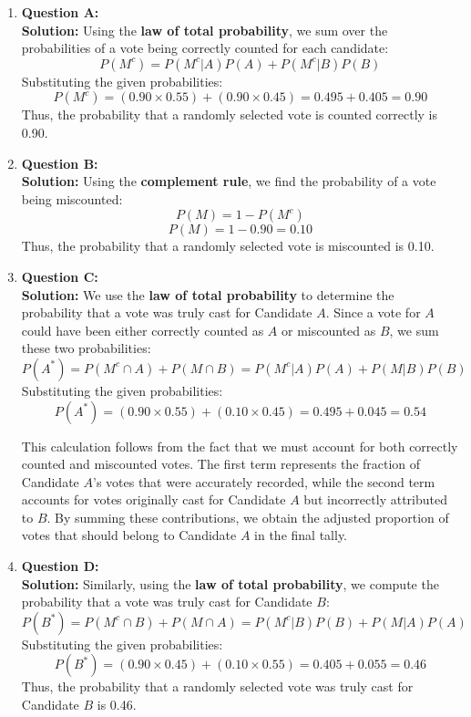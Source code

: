 \documentclass{article}
\begin{document}
\begin{enumerate}

    \item \textbf{Question A:} \\
    \textbf{Solution:} Using the \textbf{law of total probability}, we sum over the probabilities of a vote being correctly counted for each candidate:
    \[
    P(M^c) = P(M^c | A) P(A) + P(M^c | B) P(B)
    \]
    Substituting the given probabilities:
    \[
    P(M^c) = (0.90 \times 0.55) + (0.90 \times 0.45) = 0.495 + 0.405 = 0.90
    \]
    Thus, the probability that a randomly selected vote is counted correctly is 0.90.

    \item \textbf{Question B:} \\
    \textbf{Solution:} Using the \textbf{complement rule}, we find the probability of a vote being miscounted:
    \[
    P(M) = 1 - P(M^c)
    \]
    \[
    P(M) = 1 - 0.90 = 0.10
    \]
    Thus, the probability that a randomly selected vote is miscounted is 0.10.

    \item \textbf{Question C:} \\
    \textbf{Solution:} We use the \textbf{law of total probability} to determine the probability that a vote was truly cast for Candidate \( A \). Since a vote for \( A \) could have been either correctly counted as \( A \) or miscounted as \( B \), we sum these two probabilities:
    \[
    P(A^*) =  P(M^c \cap A) + P(M \cap B) = P(M^c | A) P(A) + P(M | B) P(B)
    \]
    Substituting the given probabilities:
    \[
    P(A^*) = (0.90 \times 0.55) + (0.10 \times 0.45) = 0.495 + 0.045 = 0.54
    \]

    This calculation follows from the fact that we must account for both correctly counted and miscounted votes. The first term represents the fraction of Candidate \( A \)'s votes that were accurately recorded, while the second term accounts for votes originally cast for Candidate \( A \) but incorrectly attributed to \( B \). By summing these contributions, we obtain the adjusted proportion of votes that should belong to Candidate \( A \) in the final tally.


    \item \textbf{Question D:} \\
    \textbf{Solution:} Similarly, using the \textbf{law of total probability}, we compute the probability that a vote was truly cast for Candidate \( B \):
    \[
    P(B^*) = P(M^c \cap B) + P(M \cap A) = P(M^c | B) P(B) + P(M | A) P(A)
    \]
    Substituting the given probabilities:
    \[
    P(B^*) = (0.90 \times 0.45) + (0.10 \times 0.55) = 0.405 + 0.055 = 0.46
    \]
    Thus, the probability that a randomly selected vote was truly cast for Candidate \( B \) is 0.46.


\end{enumerate}
\end{document}
